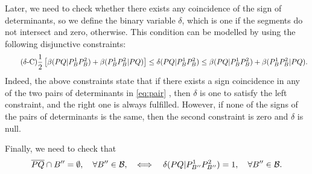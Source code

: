 \documentclass[a4paper,  review, authoryear, 1p., doubleblind]{elsarticle}
\newcommand{\B}{{\mathcal B}}
\newcommand{\ES}{{E^{}_{S}}}
\newcommand{\segment}[2]{\overline{#1#2}}
\newcommand{\determinant}[3]{\det({#1|#2#3})}
\begin{document}
	Later, we need to check whether there exists any coincidence of the sign of determinants, so we define the binary variable $\delta$, which is one if the segments do not intersect and zero, otherwise. This condition can be modelled by using the following disjunctive constraints:
	\begin{equation*}\tag{$\delta$-C}\label{eq:deltaC}
		\frac{1}{2}\left[\beta(PQ|P_B^1P_B^2)+\beta(P_B^1P_B^2|PQ)\right]\leq\delta(PQ|P_B^1P_B^2)\leq \beta(PQ|P_B^1P_B^2)+\beta(P_B^1P_B^2|PQ).
	\end{equation*}
	Indeed, the above constraints state that if there exists a sign coincidence in any of the two pairs of determinants in \eqref{eq:pair} , then $\delta$ is one to satisfy the left constraint, and the right one is always fulfilled. However, if none of the signs of the pairs of determinants is the same, then the second constraint is zero and $\delta$ is null.
	
	Finally, we need to check that
	$$\overline{PQ}\cap B''=\emptyset,\quad \forall B''\in\B,\quad\Longleftrightarrow\quad \deltacheck{P}{Q}{P_{B''}^1}{P_{B''}^2}=1,\quad\forall B''\in\B.$$
	
	
	\newcommand{\varepsilonvar}[2]{\varepsilon(#1#2)}
	
\end{document}
